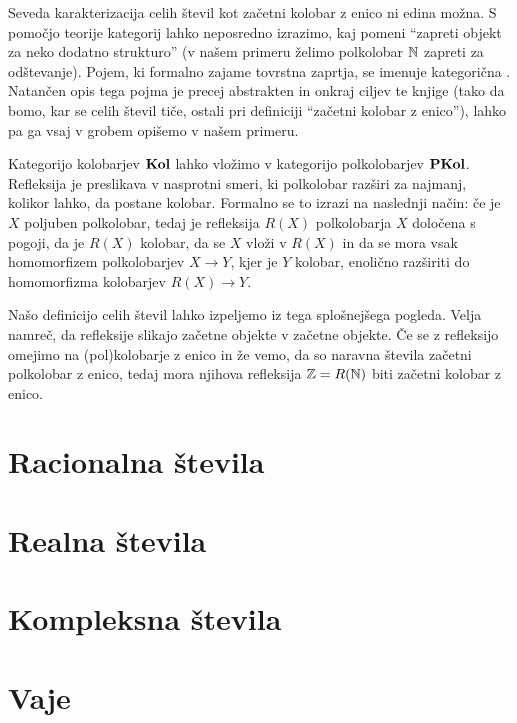 Seveda karakterizacija celih števil kot začetni kolobar z enico ni edina možna. S pomočjo teorije kategorij lahko neposredno izrazimo, kaj pomeni ``zapreti objekt za neko dodatno strukturo'' (v našem primeru želimo polkolobar $\mathbb{N}$ zapreti za odštevanje). Pojem, ki formalno zajame tovrstna zaprtja, se imenuje kategorična . Natančen opis tega pojma je precej abstrakten in onkraj ciljev te knjige (tako da bomo, kar se celih števil tiče, ostali pri definiciji ``začetni kolobar z enico''), lahko pa ga vsaj v grobem opišemo v našem primeru.

Kategorijo kolobarjev $\mathbf{Kol}$ lahko vložimo v kategorijo polkolobarjev $\mathbf{PKol}$. Refleksija je preslikava v nasprotni smeri, ki polkolobar razširi za najmanj, kolikor lahko, da postane kolobar. Formalno se to izrazi na naslednji način: če je $X$ poljuben polkolobar, tedaj je refleksija $R(X)$ polkolobarja $X$ določena s pogoji, da je $R(X)$ kolobar, da se $X$ vloži v $R(X)$ in da se mora vsak homomorfizem polkolobarjev $X \to Y$, kjer je $Y$ kolobar, enolično razširiti do homomorfizma kolobarjev $R(X) \to Y$.

Našo definicijo celih števil lahko izpeljemo iz tega splošnejšega pogleda. Velja namreč, da refleksije slikajo začetne objekte v začetne objekte. Če se z refleksijo omejimo na (pol)kolobarje z enico in že vemo, da so naravna števila začetni polkolobar z enico, tedaj mora njihova refleksija $\mathbb{Z} = R(\mathbb{N})$ biti začetni kolobar z enico.


\section{Racionalna števila}
\section{Realna števila}
\section{Kompleksna števila}



\section{Vaje}

